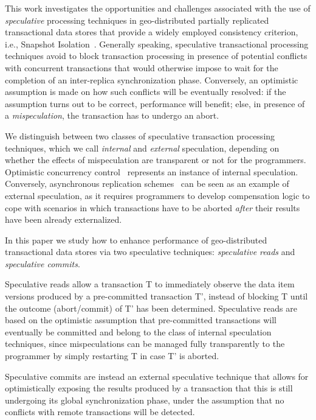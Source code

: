 This work investigates the opportunities and challenges associated with the use of \textit{speculative} processing techniques in geo-distributed partially replicated transactional data stores  that provide a widely employed consistency criterion, i.e., Snapshot Isolation~\cite{xxx}. Generally speaking, speculative transactional processing techniques avoid to block transaction processing in presence of potential conflicts with concurrent transactions that would otherwise impose to wait for the completion of an inter-replica synchronization phase. Conversely, an optimistic assumption is made on how  such conflicts will be eventually resolved: if the assumption turns out to be correct, performance will benefit; else, in presence of a \textit{mispeculation}, the transaction has to undergo an abort.

We distinguish between two classes of speculative transaction processing techniques, which we call \textit{internal} and \textit{external} speculation,  depending on whether the effects of mispeculation are transparent or not for the programmers. Optimistic concurrency control~\cite{xxx} represents an instance of internal speculation. Conversely, asynchronous replication schemes~\cite{eventuallyconsistenttransactions} can be seen as an example of external speculation, as it requires programmers to develop compensation logic to cope with scenarios in which transactions have to be aborted \textit{after} their results have been already externalized.

In this paper we study how  to enhance performance of geo-distributed transactional data stores via two speculative techniques: \textit{speculative reads} and \textit{speculative commits}.

Speculative reads  allow a transaction T to immediately observe the  data item versions produced by a pre-committed transaction T', instead of blocking T until the outcome (abort/commit) of T' has been determined. Speculative reads are based on the optimistic assumption that pre-committed transactions will eventually be committed and belong to the class of internal speculation techniques, since  mispeculations can be managed fully transparently to the programmer by simply restarting T in case T' is aborted.


Speculative commits are instead an external speculative technique that allows for optimistically exposing the results produced by a transaction that this is still undergoing its global synchronization phase, under the assumption that no conflicts with remote transactions will be detected.

